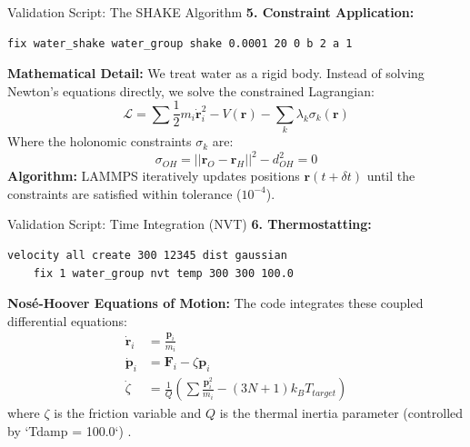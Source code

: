 \documentclass[aspectratio=169, 10pt]{beamer}
\begin{document}
\begin{frame}[fragile]{Validation Script: The SHAKE Algorithm}
    \textbf{5. Constraint Application:}
    \begin{lstlisting}[language=bash]
    fix water_shake water_group shake 0.0001 20 0 b 2 a 1
    \end{lstlisting}
    
    \textbf{Mathematical Detail:}
    We treat water as a rigid body. Instead of solving Newton's equations directly, we solve the constrained Lagrangian:
    \begin{equation}
        \mathcal{L} = \sum \frac{1}{2} m_i \dot{\mathbf{r}}_i^2 - V(\mathbf{r}) - \sum_{k} \lambda_k \sigma_k(\mathbf{r})
    \end{equation}
    Where the holonomic constraints $\sigma_k$ are:
    \begin{equation}
        \sigma_{OH} = ||\mathbf{r}_O - \mathbf{r}_H||^2 - d_{OH}^2 = 0
    \end{equation}
    \textbf{Algorithm:}
    LAMMPS iteratively updates positions $\mathbf{r}(t+\delta t)$ until the constraints are satisfied within tolerance ($10^{-4}$).
\end{frame}

\begin{frame}[fragile]{Validation Script: Time Integration (NVT)}
    \textbf{6. Thermostatting:}
    \begin{lstlisting}[language=bash]
    velocity all create 300 12345 dist gaussian
    fix 1 water_group nvt temp 300 300 100.0
    \end{lstlisting}

    \textbf{Nosé-Hoover Equations of Motion:}
    The code integrates these coupled differential equations:
    \begin{align}
        \dot{\mathbf{r}}_i &= \frac{\mathbf{p}_i}{m_i} \\
        \dot{\mathbf{p}}_i &= \mathbf{F}_i - \zeta \mathbf{p}_i \\
        \dot{\zeta} &= \frac{1}{Q} \left( \sum \frac{\mathbf{p}_i^2}{m_i} - (3N+1)k_B T_{target} \right)
    \end{align}
    where $\zeta$ is the friction variable and $Q$ is the thermal inertia parameter (controlled by `Tdamp = 100.0`) .
\end{frame}
\end{document}
